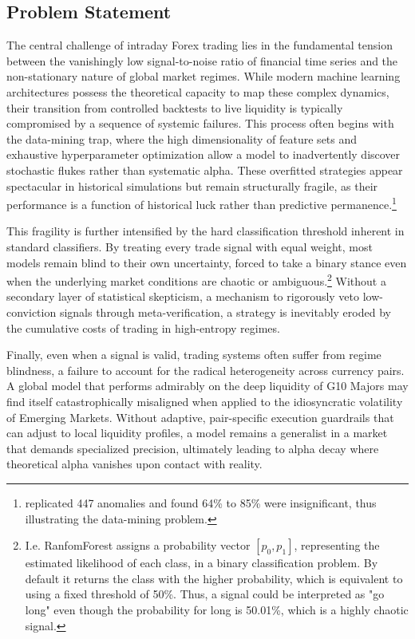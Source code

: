 \documentclass[12pt, a4paper]{article}
\begin{document}
\subsection{Problem Statement}\label{sec:problem_statement}

The central challenge of intraday Forex trading lies in the fundamental tension between the vanishingly low signal-to-noise ratio of 
financial time series and the non-stationary nature of global market regimes.
While modern machine learning architectures possess the theoretical capacity to map these complex dynamics, 
their transition from controlled backtests to live liquidity is typically compromised by a sequence of systemic failures.
This process often begins with the data-mining trap, where the high dimensionality of feature sets and 
exhaustive hyperparameter optimization allow a model to inadvertently discover stochastic flukes rather than systematic alpha.
These overfitted strategies appear spectacular in historical simulations but remain structurally fragile, 
as their performance is a function of historical luck rather than predictive permanence.\footnote{\textcite{hou2020replicating} replicated 
447 anomalies and found 64\% to 85\% were insignificant, thus illustrating the data-mining problem.}

\medskip

This fragility is further intensified by the hard classification threshold inherent in standard classifiers.
By treating every trade signal with equal weight, most models remain blind to their own uncertainty, forced to take a binary stance
even when the underlying market conditions are chaotic or ambiguous.\footnote{I.e. RanfomForest assigns a probability vector $[p_0, p_1]$, representing the 
estimated likelihood of each class, in a binary classification problem. By default it returns the class with the higher probability, which is equivalent to 
using a fixed threshold of 50\%. Thus, a signal could be interpreted as "go long" even though the probability for long is 50.01\%, which is a highly chaotic signal.} 
Without a secondary layer of statistical skepticism, a mechanism to rigorously veto low-conviction signals through meta-verification, 
a strategy is inevitably eroded by the cumulative costs of trading in high-entropy regimes.

\medskip

Finally, even when a signal is valid, trading systems often suffer from regime blindness, a failure to account for the radical heterogeneity across currency pairs. 
A global model that performs admirably on the deep liquidity of G10 Majors may find itself catastrophically misaligned when applied to the 
idiosyncratic volatility of Emerging Markets.
Without adaptive, pair-specific execution guardrails that can adjust to local liquidity profiles, a model remains a
generalist in a market that demands specialized precision, ultimately leading to alpha decay where theoretical alpha vanishes upon contact with reality.
\end{document}

